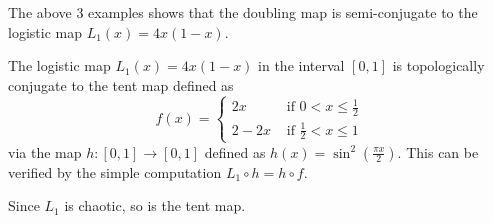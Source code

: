 \begin{example}\label{ex_logistic_and_doubling}
	The above 3 examples shows that the doubling map is semi-conjugate to the logistic map $L_1(x) = 4x(1-x)$.
\end{example}

\begin{example}\label{ex:logistic and tent}
	The logistic map $L_1(x) = 4x(1-x)$ in the interval $[0,1]$ is topologically conjugate to the tent map defined as 
	\begin{equation}
		f(x) = 
		\begin{cases}
			2x   &\text{ if } 0<x \leq \frac{1}{2} \\ 
			2-2x &\text{ if } \frac{1}{2} < x \leq 1
		\end{cases}
	\end{equation}
	via the map $h: [0,1] \rightarrow [0,1]$ defined as $h(x) = \sin^2(\frac{\pi x}{2})$.
	This can be verified by the simple computation $L_1 \circ h = h \circ f$.

	Since $L_1$ is chaotic, so is the tent map.
\end{example}

